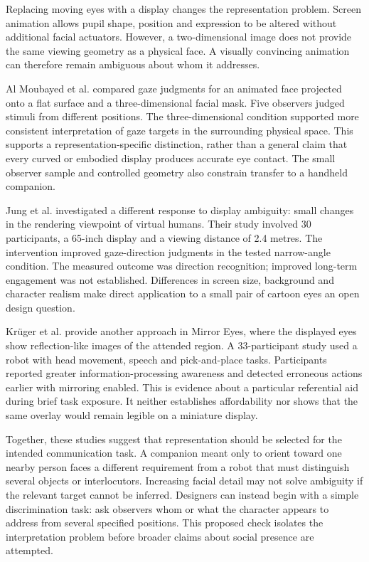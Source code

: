 \documentclass[11pt,a4paper]{article}
\begin{document}
Replacing moving eyes with a display changes the representation problem. Screen animation allows pupil shape, position and expression to be altered without additional facial actuators. However, a two-dimensional image does not provide the same viewing geometry as a physical face. A visually convincing animation can therefore remain ambiguous about whom it addresses.

Al Moubayed et al. \cite{r6} compared gaze judgments for an animated face projected onto a flat surface and a three-dimensional facial mask. Five observers judged stimuli from different positions. The three-dimensional condition supported more consistent interpretation of gaze targets in the surrounding physical space. This supports a representation-specific distinction, rather than a general claim that every curved or embodied display produces accurate eye contact. The small observer sample and controlled geometry also constrain transfer to a handheld companion.

Jung et al. \cite{r7} investigated a different response to display ambiguity: small changes in the rendering viewpoint of virtual humans. Their study involved 30 participants, a 65-inch display and a viewing distance of 2.4 metres. The intervention improved gaze-direction judgments in the tested narrow-angle condition. The measured outcome was direction recognition; improved long-term engagement was not established. Differences in screen size, background and character realism make direct application to a small pair of cartoon eyes an open design question.

Krüger et al. \cite{r8} provide another approach in Mirror Eyes, where the displayed eyes show reflection-like images of the attended region. A 33-participant study used a robot with head movement, speech and pick-and-place tasks. Participants reported greater information-processing awareness and detected erroneous actions earlier with mirroring enabled. This is evidence about a particular referential aid during brief task exposure. It neither establishes affordability nor shows that the same overlay would remain legible on a miniature display.

Together, these studies suggest that representation should be selected for the intended communication task. A companion meant only to orient toward one nearby person faces a different requirement from a robot that must distinguish several objects or interlocutors. Increasing facial detail may not solve ambiguity if the relevant target cannot be inferred. Designers can instead begin with a simple discrimination task: ask observers whom or what the character appears to address from several specified positions. This proposed check isolates the interpretation problem before broader claims about social presence are attempted.
\end{document}
